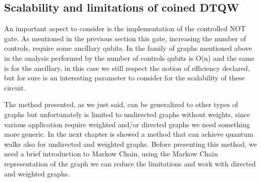 \subsection{Scalability and limitations of coined DTQW}

An important aspect to consider is the implementation of the controlled NOT gate. As mentioned in the previous section this gate, 
increasing the number of controls, require some ancillary qubits. In the family of graphs mentioned above in the analysis performed by 
\cite{douglas2014complexity} the number of controls qubits is O(n) and the same is for the ancillary, in this case we still respect the 
notion of efficiency declared, but for sure is an interesting parameter to consider for the scalability of these circuit. 

The method presented, as we just said, can be generalized to other types of graphs but unfortunately is limited to undirected graphs
without weights, since various application require weighted and/or directed graphs we need something more generic. In the next chapter
is showed a method that can achieve quantum walks also for undirected and weighted graphs. Before presenting this method, we need a 
brief introduction to Markow Chain, using the Markow Chain representation of the graph we can reduce the limitations and work with 
directed and weighted graphs.